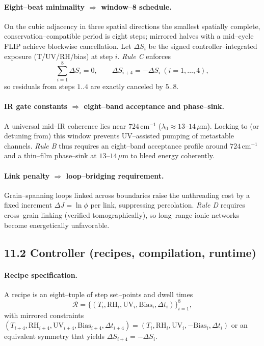 \documentclass[12pt]{article}
\begin{document}
\paragraph{Eight–beat minimality $\Rightarrow$ window–8 schedule.}
On the cubic adjacency in three spatial directions the smallest spatially complete, conservation–compatible period is eight steps; mirrored halves with a mid–cycle FLIP achieve blockwise cancellation. Let $\Delta S_i$ be the signed controller–integrated exposure (T/UV/RH/bias) at step $i$. \emph{Rule C} enforces
\[
\sum_{i=1}^{8}\Delta S_i=0,\qquad \Delta S_{i+4}=-\Delta S_i\ (i=1,\dots,4),
\]
so residuals from steps $1..4$ are exactly canceled by $5..8$.

\paragraph{IR gate constants $\Rightarrow$ eight–band acceptance and phase–sink.}
A universal mid–IR coherence lies near $724\,\mathrm{cm}^{-1}$ ($\lambda_0\!\approx\!13$–$14\,\mu$m). Locking to (or detuning from) this window prevents UV–assisted pumping of metastable channels. \emph{Rule B} thus requires an eight–band acceptance profile around $724\,\mathrm{cm}^{-1}$ and a thin–film phase–sink at $13$–$14\,\mu$m to bleed energy coherently.

\paragraph{Link penalty $\Rightarrow$ loop–bridging requirement.}
Grain–spanning loops linked across boundaries raise the unthreading cost by a fixed increment $\Delta J=\ln\phi$ per link, suppressing percolation. \emph{Rule D} requires cross–grain linking (verified tomographically), so long–range ionic networks become energetically unfavorable.

\subsection*{11.2 Controller (recipes, compilation, runtime)}
\paragraph{Recipe specification.}
A recipe is an eight–tuple of step set–points and dwell times
\[
\mathcal{R}=\{(T_i,\mathrm{RH}_i,\mathrm{UV}_i,\mathrm{Bias}_i,\Delta t_i)\}_{i=1}^8,
\]
with mirrored constraints $(T_{i+4},\mathrm{RH}_{i+4},\mathrm{UV}_{i+4},\mathrm{Bias}_{i+4},\Delta t_{i+4})=(T_i,\mathrm{RH}_i,\mathrm{UV}_i,-\mathrm{Bias}_i,\Delta t_i)$ or an equivalent symmetry that yields $\Delta S_{i+4}=-\Delta S_i$.
\end{document}
